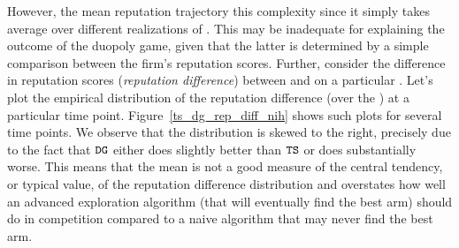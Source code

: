 \documentclass[../competing_bandits.tex]{subfiles}
\begin{document}
However, the mean reputation trajectory  this complexity since it simply takes average over different realizations of \MRVs. This may be inadequate for explaining the outcome of the duopoly game, given that the latter is determined by a simple comparison between the firm's reputation scores. Further, consider the difference in reputation scores (\emph{reputation difference}) between \TS and \DG on a particular \MRV. Let's plot the empirical distribution of the reputation difference (over the \MRVs) at a particular time point. Figure~\ref{ts_dg_rep_diff_nih} shows such plots for several time points.
We observe that the distribution is skewed to the right, precisely due to the fact that $\mathtt{DG}$ either does slightly better than $\mathtt{TS}$ or does substantially worse. This means that the mean is not a good measure of the central tendency, or typical value, of the reputation difference distribution and overstates how well an advanced exploration algorithm (that will eventually find the best arm) should do in competition compared to a naive algorithm that may never find the best arm.
\end{document}
